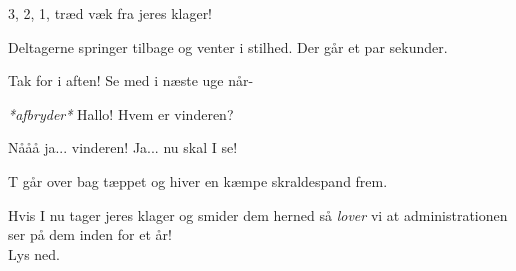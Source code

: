 \documentclass[a4paper,11pt]{article}
\begin{document}
\begin{sketch}
 3, 2, 1, træd væk fra jeres klager!  

\scene Deltagerne springer tilbage og venter i stilhed. Der går et par sekunder.

 Tak for i aften! Se med i næste uge når-

 \textit{*afbryder*} Hallo! Hvem er vinderen?

 Nååå ja... vinderen! Ja... nu skal I se!

\scene T går over bag tæppet og hiver en kæmpe skraldespand frem.

 Hvis I nu tager jeres klager og smider dem herned  så \textit{lover} vi at administrationen ser på dem inden for et år! \\

\scene Lys ned.
\end{sketch}
\end{document}
